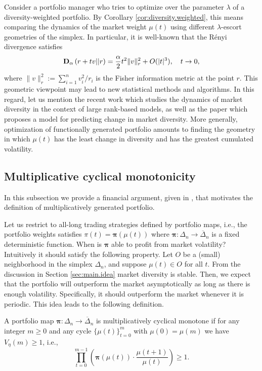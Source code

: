 \documentclass[graybox]{svmult}
\begin{document}
Consider a portfolio manager who tries to optimize over the parameter $\lambda$ of a diversity-weighted portfolio. By Corollary \ref{cor:diversity.weighted}, this means comparing the dynamics of the market weight $\mu(t)$ using different $\lambda$-escort geometries of the simplex. In particular, it is well-known that the R\'{e}nyi divergence satisfies
\begin{equation} \label{eqn:Renyi.Taylor}
{\bf D}_{\alpha} \left(r + tv || r\right) = \frac{\alpha}{2} t^2 \|v\|_r^2 + O(|t|^3), \quad t \rightarrow 0,
\end{equation}
where $\| v\|_r^2 := \sum_{i = 1}^n v_i^2 / r_i$ is the Fisher information metric at the point $r$. This geometric viewpoint may lead to new statistical methods and algorithms. In this regard, let us mention the recent work \cite{MSZ18} which studies the dynamics of market diversity in the context of large rank-based models, as well as the paper \cite{AFF07} which proposes a model for predicting change in market diversity. More generally, optimization of functionally generated portfolio amounts to finding the geometry in which $\mu(t)$ has the least change in diversity and has the greatest cumulated volatility.


\subsection{Multiplicative cyclical monotonicity}
In this subsection we provide a financial argument, given in \cite{PW15}, that motivates the definition of multiplicatively generated portfolio. 

Let us restrict to all-long trading strategies defined by portfolio maps, i.e., the portfolio weights satisfies $\pi(t) = \boldsymbol{\pi}(\mu(t))$ where $\boldsymbol{\pi}: \Delta_n \rightarrow \overline{\Delta}_n$ is a fixed deterministic function. When is $\boldsymbol{\pi}$ able to profit from market volatility? Intuitively it should satisfy the following property. Let $O$ be a (small) neighborhood in the simplex $\Delta_n$, and suppose $\mu(t) \in O$ for all $t$. From the discussion in Section \ref{sec:main.idea} market diversity is stable. Then, we expect that the portfolio will outperform the market asymptotically as long as there is enough volatility. Specifically, it should outperform the market whenever it is periodic. This idea leads to the following definition.

\begin{definition}
A portfolio map $\boldsymbol{\pi}: \Delta_n \rightarrow \overline{\Delta}_n$ is multiplicatively cyclical monotone if for any integer $m \geq 0$ and any cycle $\{\mu(t)\}_{t = 0}^m$ with $\mu(0) = \mu(m)$ we have $V_{\eta}(m) \geq 1$, i.e.,
\begin{equation} \label{eqn:mcm}
\prod_{t = 0}^{m - 1} \left( \boldsymbol{\pi}(\mu(t)) \cdot \frac{\mu(t + 1)}{\mu(t)}\right) \geq 1.
\end{equation}
\end{definition}
\end{document}

